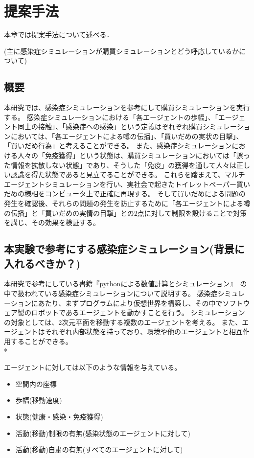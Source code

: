 \chapter{提案手法}
\label{proposed}

本章では提案手法について述べる．

(主に感染症シミュレーションが購買シミュレーションとどう呼応しているかについて)

\section{概要}

本研究では、感染症シミュレーションを参考にして購買シミュレーションを実行する。
感染症シミュレーションにおける「各エージェントの歩幅」、「エージェント同士の接触」、「感染症への感染」という定義はぞれぞれ購買シミュレーションにおいては、「各エージェントによる噂の伝播」、「買いだめの実状の目撃」、「買いだめ行為」と考えることができる。
また、感染症シミュレーションにおける人々の「免疫獲得」という状態は、購買シミュレーションにおいては「誤った情報を拡散しない状態」であり、そうした「免疫」の獲得を通して人々は正しい認識を得た状態であると見立てることができる。
これらを踏まえて、マルチエージェントシミュレーションを行い、実社会で起きたトイレットペーパー買いだめの様相をコンピュータ上で正確に再現する。
そして買いだめによる問題の発生を確認後、それらの問題の発生を防止するために「各エージェントによる噂の伝播」と「買いだめの実情の目撃」との2点に対して制限を設けることで対策を講じ、その効果を検証する。

\section{本実験で参考にする感染症シミュレーション(背景に入れるべきか？)}
本研究で参考にしている書籍『pythonによる数値計算とシミュレーション』~\cite{感染症}の中で扱われている感染症シミュレーションについて説明する。
感染症シミュレーションにあたり、まずプログラムにより仮想世界を構築し、その中でソフトウェア製のロボットであるエージェントを動かすことを行う。
シミュレーションの対象としては、2次元平面を移動する複数のエージェントを考える。
また、エージェントはそれぞれ内部状態を持っており、環境や他のエージェントと相互作用することができる。\\*

エージェントに対しては以下のような情報を与えている。

\begin{itemize}
  \item 空間内の座標
  \item 歩幅(移動速度)
  \item 状態(健康・感染・免疫獲得)
  \item 活動(移動)制限の有無(感染状態のエージェントに対して)
  \item 活動(移動)自粛の有無(すべてのエージェントに対して)
\end{itemize}

